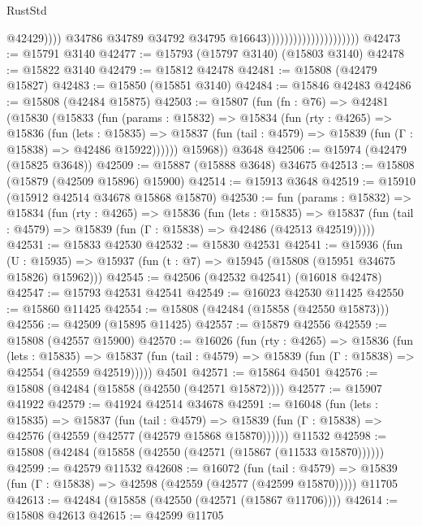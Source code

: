\begin{lexlean}{RustStd}
\begin{coremodule}
                                                      @42429))))
                                              @34786
                                              @34789
                                              @34792
                                              @34795
                                              @16643)))))))))))))))))))))
@42473 := @15791 @3140
@42477 := @15793 (@15797 @3140) (@15803 @3140)
@42478 := @15822 @3140
@42479 := @15812 @42478
@42481 := @15808 (@42479 @15827)
@42483 := @15850 (@15851 @3140)
@42484 := @15846 @42483
@42486 := @15808 (@42484 @15875)
@42503 := @15807
    (fun (fn : @76) =>
    @42481
      (@15830
        (@15833
          (fun (params : @15832) =>
          @15834
            (fun (rty : @4265) =>
            @15836
              (fun (lets : @15835) =>
              @15837 (fun (tail : @4579) => @15839 (fun (Γ : @15838) => @42486 @15922))))))
        @15968))
    @3648
@42506 := @15974 (@42479 (@15825 @3648))
@42509 := @15887 (@15888 @3648) @34675
@42513 := @15808 (@15879 (@42509 @15896) @15900)
@42514 := @15913 @3648
@42519 := @15910 (@15912 @42514 @34678 @15868 @15870)
@42530 := fun (params : @15832) =>
  @15834
    (fun (rty : @4265) =>
    @15836
      (fun (lets : @15835) =>
      @15837 (fun (tail : @4579) => @15839 (fun (Γ : @15838) => @42486 (@42513 @42519)))))
@42531 := @15833 @42530
@42532 := @15830 @42531
@42541 := @15936
    (fun (U : @15935) => @15937 (fun (t : @7) => @15945 (@15808 (@15951 @34675 @15826) @15962)))
@42545 := @42506 (@42532 @42541) (@16018 @42478)
@42547 := @15793 @42531 @42541
@42549 := @16023 @42530 @11425
@42550 := @15860 @11425
@42554 := @15808 (@42484 (@15858 (@42550 @15873)))
@42556 := @42509 (@15895 @11425)
@42557 := @15879 @42556
@42559 := @15808 (@42557 @15900)
@42570 := @16026
    (fun (rty : @4265) =>
    @15836
      (fun (lets : @15835) =>
      @15837 (fun (tail : @4579) => @15839 (fun (Γ : @15838) => @42554 (@42559 @42519)))))
    @4501
@42571 := @15864 @4501
@42576 := @15808 (@42484 (@15858 (@42550 (@42571 @15872))))
@42577 := @15907 @41922
@42579 := @41924 @42514 @34678
@42591 := @16048
    (fun (lets : @15835) =>
    @15837
      (fun (tail : @4579) =>
      @15839 (fun (Γ : @15838) => @42576 (@42559 (@42577 (@42579 @15868 @15870))))))
    @11532
@42598 := @15808 (@42484 (@15858 (@42550 (@42571 (@15867 (@11533 @15870))))))
@42599 := @42579 @11532
@42608 := @16072
    (fun (tail : @4579) => @15839 (fun (Γ : @15838) => @42598 (@42559 (@42577 (@42599 @15870)))))
    @11705
@42613 := @42484 (@15858 (@42550 (@42571 (@15867 @11706))))
@42614 := @15808 @42613
@42615 := @42599 @11705

\end{coremodule}
\end{lexlean}
